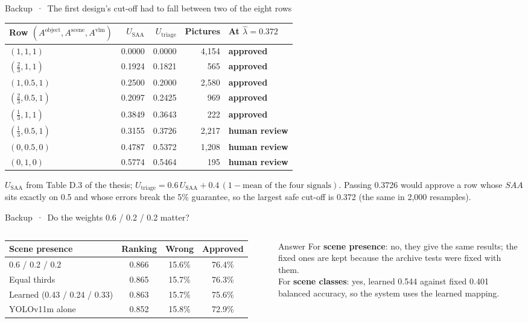 \documentclass[aspectratio=169,10pt]{beamer}
\newcommand{\yes}[1]{{\color{okc}\bfseries #1}}
\newcommand{\no}[1]{{\color{pers}\bfseries #1}}
\begin{document}
\begin{frame}{Backup \,·\, The first design's cut-off had to fall between two of the eight rows}
\small
\renewcommand{\arraystretch}{1.12}
\begin{tabular}{@{}l r r r l@{}}
\toprule
Row $(A^{\text{object}}, A^{\text{scene}}, A^{\text{vlm}})$ & $U_{\text{SAA}}$ & $U_{\text{triage}}$ & Pictures & At $\hat\lambda = 0.372$\\
\midrule
$(1, 1, 1)$ & 0.0000 & 0.0000 & 4,154 & \yes{approved}\\
$(\tfrac23, 1, 1)$ & 0.1924 & 0.1821 & 565 & \yes{approved}\\
$(1, 0.5, 1)$ & 0.2500 & 0.2000 & 2,580 & \yes{approved}\\
$(\tfrac23, 0.5, 1)$ & 0.2097 & 0.2425 & 969 & \yes{approved}\\
$(\tfrac13, 1, 1)$ & 0.3849 & 0.3643 & 222 & \yes{approved}\\
$(\tfrac13, 0.5, 1)$ & 0.3155 & 0.3726 & 2,217 & \no{human review}\\
$(0, 0.5, 0)$ & 0.4787 & 0.5372 & 1,208 & \no{human review}\\
$(0, 1, 0)$ & 0.5774 & 0.5464 & 195 & \no{human review}\\
\bottomrule
\end{tabular}
\par\vspace{6pt}
{\footnotesize $U_{\text{SAA}}$ from Table D.3 of the thesis; $U_{\text{triage}} = 0.6\,U_{\text{SAA}} + 0.4\,(1 - \text{mean of the four signals})$. Passing 0.3726 would approve a row whose $SAA$ sits exactly on 0.5 and whose errors break the 5\% guarantee, so the largest safe cut-off is 0.372 (the same in 2,000 resamples).}
\end{frame}

\begin{frame}{Backup \,·\, Do the weights 0.6 / 0.2 / 0.2 matter?}
\small
\begin{columns}[T,onlytextwidth]
\renewcommand{\arraystretch}{1.2}\footnotesize
\begin{tabular}{@{}l c c c@{}}
\toprule
Scene presence & Ranking & Wrong & Approved\\
\midrule
0.6 / 0.2 / 0.2 & 0.866 & 15.6\% & 76.4\%\\
Equal thirds & 0.865 & 15.7\% & 76.3\%\\
Learned (0.43 / 0.24 / 0.33) & 0.863 & 15.7\% & 75.6\%\\
YOLOv11m alone & 0.852 & 15.8\% & 72.9\%\\
\bottomrule
\end{tabular}
\begin{defbox}{Answer}
For \textbf{scene presence}: no, they give the same results; the fixed ones are kept because the archive tests were fixed with them.\\[2pt]
For \textbf{scene classes}: yes, learned 0.544 against fixed 0.401 balanced accuracy, so the system uses the learned mapping.
\end{defbox}
\end{columns}
\end{frame}
\end{document}
